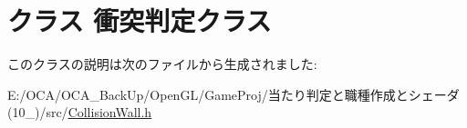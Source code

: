 \hypertarget{class_xE8_xA1_x9D_xE7_xAA_x81_xE5_x88_xA4_xE5_xAE_x9A_xE3_x82_xAF_xE3_x83_xA9_xE3_x82_xB9}{\section{クラス 衝突判定クラス}
\label{class_xE8_xA1_x9D_xE7_xAA_x81_xE5_x88_xA4_xE5_xAE_x9A_xE3_x82_xAF_xE3_x83_xA9_xE3_x82_xB9}
}


このクラスの説明は次のファイルから生成されました\-:\begin{DoxyCompactItemize}
\item 
E\-:/\-O\-C\-A/\-O\-C\-A\-\_\-\-Back\-Up/\-Open\-G\-L/\-Game\-Proj/当たり判定と職種作成とシェーダ(10\-\_)/src/\hyperlink{_collision_wall_8h}{Collision\-Wall.\-h}\end{DoxyCompactItemize}
